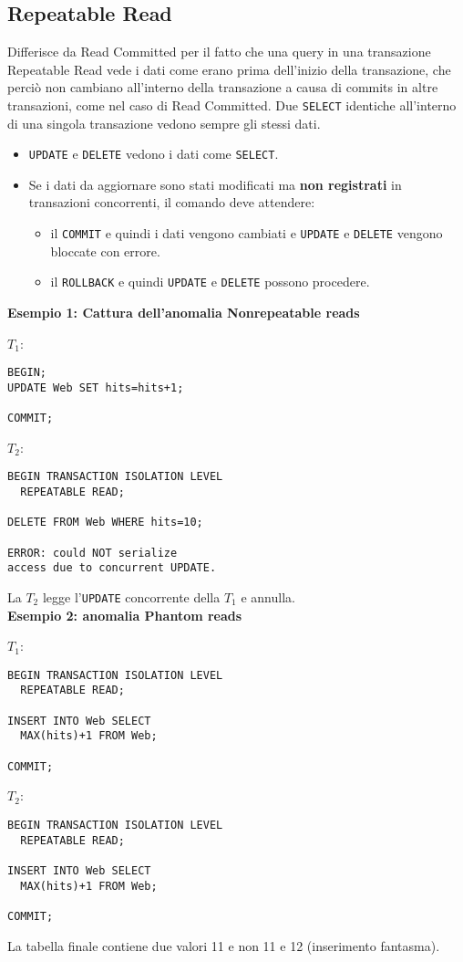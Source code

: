 \documentclass[a4paper, 10pt, titlepage]{article}
\begin{document}
		\subsection{Repeatable Read}
			Differisce da Read Committed per il fatto che una query in una transazione Repeatable Read vede i dati come erano prima dell'inizio della transazione, che perciò non cambiano all'interno della transazione a causa di commits in altre transazioni, come nel caso di Read Committed. Due \lstinline|SELECT| identiche all'interno di una singola transazione vedono sempre gli stessi dati.
			\begin{itemize}
				\item \lstinline|UPDATE| e \lstinline|DELETE| vedono i dati come \lstinline|SELECT|.
				\item Se i dati da aggiornare sono stati modificati ma \textbf{non registrati} in transazioni concorrenti, il comando deve attendere: 
				\begin{itemize}
					\item il \lstinline|COMMIT| e quindi i dati vengono cambiati e \lstinline|UPDATE| e \lstinline|DELETE| vengono bloccate con errore.
					\item il \lstinline|ROLLBACK| e quindi \lstinline|UPDATE| e \lstinline|DELETE| possono procedere.
				\end{itemize}
			\end{itemize}
			
			\noindent
			\textbf{Esempio 1: Cattura dell'anomalia Nonrepeatable reads}
			\begin{multicols}{2}
			\noindent
			$ T_1 $:
			\begin{lstlisting}
BEGIN;
UPDATE Web SET hits=hits+1;

COMMIT;
			\end{lstlisting}
			\columnbreak
			$ T_2 $:
			\begin{lstlisting}
BEGIN TRANSACTION ISOLATION LEVEL
  REPEATABLE READ;

DELETE FROM Web WHERE hits=10;

ERROR: could NOT serialize 
access due to concurrent UPDATE.
			\end{lstlisting}
			\end{multicols} 
			La $T_2$ legge l'\lstinline|UPDATE| concorrente della $T_1$ e annulla. \medskip \\
			\textbf{Esempio 2: anomalia Phantom reads}
			\begin{multicols}{2}
			\noindent
			$ T_1 $:
			\begin{lstlisting}
BEGIN TRANSACTION ISOLATION LEVEL
  REPEATABLE READ;
 
INSERT INTO Web SELECT
  MAX(hits)+1 FROM Web;
  
COMMIT;
			\end{lstlisting}
			\columnbreak
			$ T_2 $:
			\begin{lstlisting}
BEGIN TRANSACTION ISOLATION LEVEL
  REPEATABLE READ;

INSERT INTO Web SELECT
  MAX(hits)+1 FROM Web;

COMMIT;
			\end{lstlisting}
			\end{multicols}
La tabella finale contiene due valori 11 e non 11 e 12 (inserimento fantasma).
		
\end{document}
